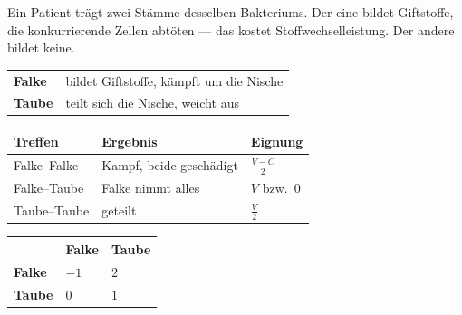 \begin{merksatz}
Ein Patient trägt zwei Stämme desselben Bakteriums. Der eine bildet Giftstoffe, die konkurrierende Zellen abtöten --- das kostet Stoffwechselleistung. Der andere bildet keine.

\begin{center}
{\small
\renewcommand{\arraystretch}{1.5}
\begin{tabular}{@{}P{2.2cm}P{6.4cm}@{}}
\toprule
\textbf{Falke} & bildet Giftstoffe, kämpft um die Nische\\
\textbf{Taube} & teilt sich die Nische, weicht aus\\
\bottomrule
\end{tabular}}
\end{center}

\begin{center}
{\small
\renewcommand{\arraystretch}{1.5}
\begin{tabular}{@{}P{2.0cm}P{2.8cm}P{2.8cm}@{}}
\toprule
\textbf{Treffen} & \textbf{Ergebnis} & \textbf{Eignung}\\
\midrule
Falke--Falke & Kampf, beide geschädigt & $\tfrac{V-C}{2}$\\
Falke--Taube & Falke nimmt alles & $V$ bzw.\ $0$\\
Taube--Taube & geteilt & $\tfrac{V}{2}$\\
\bottomrule
\end{tabular}}
\end{center}

\begin{center}
{\small
\renewcommand{\arraystretch}{1.6}
\begin{tabular}{@{}P{2.0cm}P{2.2cm}P{2.2cm}@{}}
\toprule
& \textbf{Falke} & \textbf{Taube}\\
\midrule
\textbf{Falke} & $-1$ & $2$\\
\textbf{Taube} & $0$ & $1$\\
\bottomrule
\end{tabular}}
\end{center}

\begin{center}
\begin{minipage}{0.88\textwidth}
\end{minipage}
\end{center}

\begin{center}
\begin{minipage}{0.88\textwidth}
\end{minipage}
\end{center}
\end{merksatz}

